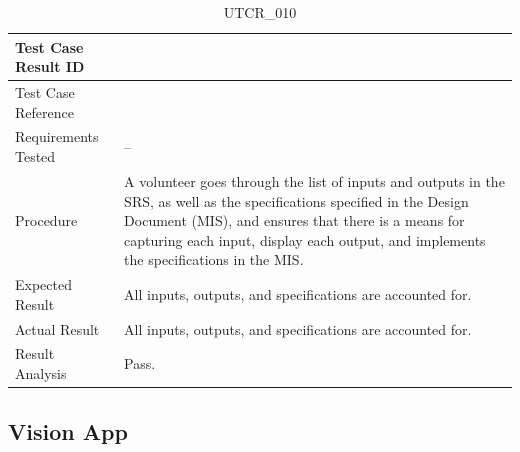 \documentclass[12pt, titlepage]{article}
\begin{document}
\begin{table}[!h]
\begin{center}
\caption {UTCR\_010}
\label{tab:UTCR_010}
\begin{tabular}{ | m{3.2cm} | m{12.2cm} | } 
\hline
Test Case Result ID & \nameref{tab:UTCR_010} \\ 
\hline
Test Case Reference & \nameref{tab:UTC_010}  \\ 
\hline
Requirements Tested & -- \\ 
\hline
Procedure & A volunteer goes through the list of inputs and outputs in the SRS, as well as the specifications specified in the Design Document (MIS), and ensures that there is a means for capturing each input, display each output, and implements the specifications in the MIS. \\ 
\hline
Expected Result & All inputs, outputs, and specifications are accounted for.  \\ 
\hline
Actual Result & All inputs, outputs, and specifications are accounted for.  \\ 
\hline
Result Analysis & Pass. \\ 
\hline
\end{tabular}
\end{center}
\end{table}

\clearpage

\subsection{Vision App}
\label{subsec:visionApp}
\end{document}

